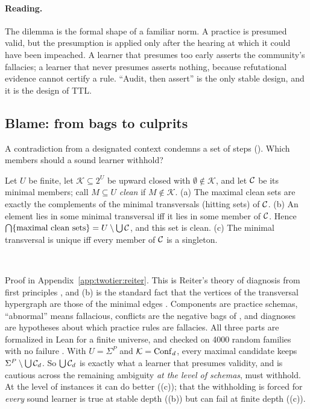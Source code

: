 \paragraph{Reading.} The dilemma is the formal shape of a familiar norm. A practice is presumed valid, but the presumption is applied only after the hearing at which it could have been impeached. A learner that presumes too early asserts the community's fallacies; a learner that never presumes asserts nothing, because refutational evidence cannot certify a rule. ``Audit, then assert'' is the only stable design, and it is the design of TTL.

\subsection{Blame: from bags to culprits}\label{sec:twotier:blame}

A contradiction from a designated context condemns a set of steps (). Which members should a sound learner withhold?

\begin{lemma}\label{lem:twotier:reiter}
Let $U$ be finite, let $\mathcal K\subseteq2^U$ be upward closed with $\emptyset\notin\mathcal K$, and let $\mathcal{C}$ be its minimal members; call $M\subseteq U$ \emph{clean} if $M\notin\mathcal K$.
\textup{(a)} The maximal clean sets are exactly the complements of the minimal transversals (hitting sets) of $\mathcal{C}$.
\textup{(b)} An element lies in some minimal transversal iff it lies in some member of $\mathcal{C}$. Hence $\bigcap\{\text{maximal clean sets}\}=U\setminus\bigcup\mathcal{C}$, and this set is clean.
\textup{(c)} The minimal transversal is unique iff every member of $\mathcal{C}$ is a singleton.
\par\hfill{}\ \ 
\end{lemma}

{\sloppy Proof in Appendix~\ref{app:twotier:reiter}. This is Reiter's theory of diagnosis from first principles \citep{reiter1987theory,dekleer1987diagnosing}, and (b) is the standard fact that the vertices of the transversal hypergraph are those of the minimal edges \citep{berge1989hypergraphs}. Components are practice schemas, ``abnormal'' means fallacious, conflicts are the negative bags of , and diagnoses are hypotheses about which practice rules are fallacies. All three parts are formalized in Lean for a finite universe, and checked on 4000 random families with no failure . With $U=\Sigma^P$ and $\mathcal K=\mathrm{Conf}_d$, every maximal candidate keeps $\Sigma^P\setminus\bigcup\mathcal{C}_d$. So $\bigcup\mathcal{C}_d$ is exactly what a learner that presumes validity, and is cautious across the remaining ambiguity \emph{at the level of schemas}, must withhold. At the level of instances it can do better ((c)); that the withholding is forced for \emph{every} sound learner is true at stable depth ((b)) but can fail at finite depth ((c)).\par}

